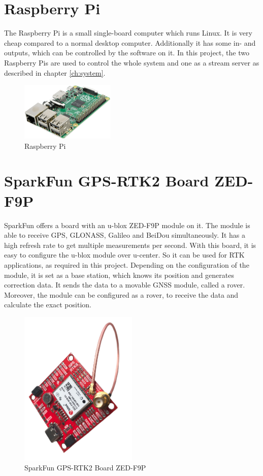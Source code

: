 \newpage

\section{Raspberry Pi}

The Raspberry Pi is a small single-board computer which runs Linux. It is very cheap compared to a normal desktop computer. Additionally it has some in- and outputs, which can be controlled by the software on it. In this project, the two Raspberry Pis are used to control the whole system and one as a stream server as described in chapter \ref{ch:system}.

\begin{figure}[htb]
	\centering
	\includegraphics [width=0.4\textwidth] {images/RPi}
	\caption{Raspberry Pi \cite{RaspberryPi}}
	\label{fig:RPi}
\end{figure}

\section{SparkFun GPS-RTK2 Board ZED-F9P}

SparkFun offers a board with an u-blox ZED-F9P module on it. The module is able to receive GPS, GLONASS, Galileo and BeiDou simultaneously. It has a high refresh rate to get multiple measurements per second. With this board, it is easy to configure the u-blox module over u-center. So it can be used for RTK applications, as required in this project. Depending on the configuration of the module, it is set as a base station, which knows its position and generates correction data. It sends the data to a movable GNSS module, called a rover. Moreover, the module can be configured as a rover, to receive the data and calculate the exact position.
\cite{ZED-F9P-Modul}
\cite{ZED-F9P-IntegrationManual}

\begin{figure}[htb]
	\centering
	\includegraphics[angle=270, width=0.5\textwidth]{images/ZED-F9P}
	\caption{SparkFun GPS-RTK2 Board ZED-F9P}
	\label{fig:ZED F9P}
\end{figure}


